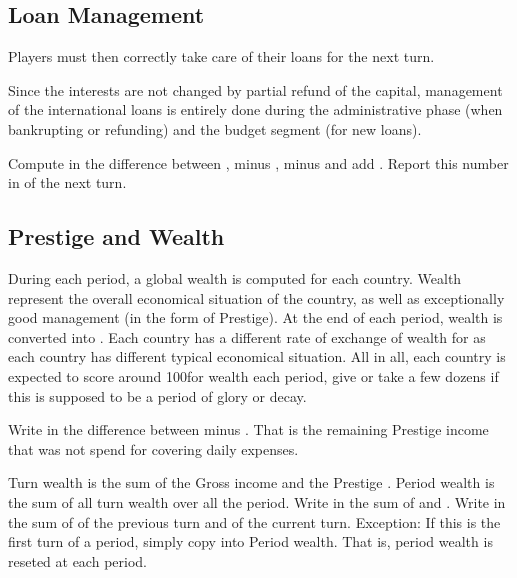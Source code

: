 \subsection{Loan Management}
\aparag Players must then correctly take care of their loans for the next
turn.

\bparag Since the interests are not changed by partial refund of the capital,
management of the international loans is entirely done during the
administrative phase (when bankrupting or refunding) and the budget segment
(for new loans).

\bparag Compute in  the difference between
, minus , minus  and add
.
\bparag Report this number in  of the
next turn.

\subsection{Prestige and Wealth}\label{chPeace:Prestige and Wealth}
\aparag[Wealth] During each period, a global wealth is computed for each
country. Wealth represent the overall economical situation of the country, as
well as exceptionally good management (in the form of Prestige).
\bparag At the end of each period, wealth is converted into \VPs. Each country
has a different rate of exchange of wealth for \VPs as each country has
different typical economical situation.
\bparag All in all, each country is expected to score around 100\VPs for
wealth each period, give or take a few dozens if this is supposed to be a
period of glory or decay.

\aparag[Prestige] Write in  the difference between
 minus . That
is the remaining Prestige income that was not spend for covering daily
expenses.

\aparag[Wealth] Turn wealth is the sum of the Gross income and the Prestige
\VPs. Period wealth is the sum of all turn wealth over all the period.
\bparag Write in  the sum of 
and .
\bparag Write in  the sum of  of the previous turn and  of the current turn.
\bparag Exception: If this is the first turn of a period, simply copy
 into {Period wealth}. That is, period wealth is reseted
at each period.

